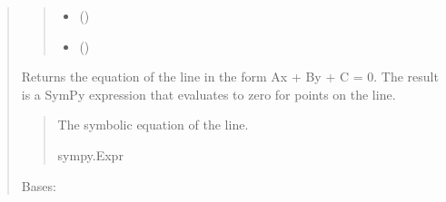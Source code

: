 \documentclass[letterpaper,10pt,english]{sphinxmanual}
\begin{document}
\begin{quote}
\begin{fulllineitems}
\begin{quote}
\begin{description}
\begin{itemize}
\item {} 
\sphinxAtStartPar
{} ()

\item {} 
\sphinxAtStartPar
{} (\sphinxstyleliteralemphasis{\sphinxupquote{ | }})

\end{itemize}

\end{description}\end{quote}

\begin{fulllineitems}
\label{\detokenize{pygeox:pygeox.basic_objects.Line.equation}}
\pysigstartsignatures
\pysigline
{}
\pysigstopsignatures
\sphinxAtStartPar
Returns the equation of the line in the form Ax + By + C = 0.
The result is a SymPy expression that evaluates to zero for points on the line.
\begin{quote}\begin{description}
\sphinxAtStartPar
The symbolic equation of the line.

\sphinxAtStartPar
sympy.Expr

\end{description}\end{quote}

\end{fulllineitems}


\end{fulllineitems}


\begin{fulllineitems}
\label{\detokenize{pygeox:pygeox.basic_objects.LineLike}}
\pysigstartsignatures
\pysiglinewithargsret
{}
{\sphinxparamcomma {}\sphinxparamcomma {}}
{}
\pysigstopsignatures
\sphinxAtStartPar
Bases: 


\end{fulllineitems}
\end{quote}
\end{document}
